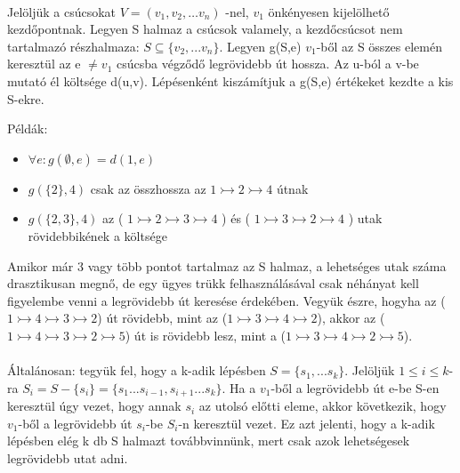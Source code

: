 \paragraph{}
Jelöljük a csúcsokat \( V=\left(v_1,v_2,\ldots v_n\right) \) -nel, \(v_1\) önkényesen kijelölhető kezdőpontnak. Legyen S halmaz a csúcsok valamely, a kezdőcsúcsot nem tartalmazó részhalmaza: \(S \subseteq \{v_2,...v_n\}\). Legyen g(S,e) \(v_1\)-ből az S összes elemén keresztül az e \(\neq v_1\)  csúcsba végződő legrövidebb út hossza. Az u-ból a v-be mutató él költsége d(u,v).
Lépésenként kiszámítjuk a g(S,e) értékeket kezdte a kis S-ekre.

Példák:
\begin{itemize}
	\item \(\forall e: g(\emptyset,e) = d(1,e)\)
	\item \(g(\{2\},4)\) csak az összhossza az  \(1 \rightarrowtail 2 \rightarrowtail 4\) útnak
	\item \(g(\{2,3\},4)\)  az ( \(1 \rightarrowtail 2 \rightarrowtail 3 \rightarrowtail 4\) ) és ( \(1 \rightarrowtail 3 \rightarrowtail 2 \rightarrowtail 4\) ) utak rövidebbikének a költsége
\end{itemize}

Amikor már 3 vagy több pontot tartalmaz az S halmaz, a lehetséges utak száma drasztikusan megnő, de egy ügyes trükk felhasználásával csak néhányat kell figyelembe venni a legrövidebb út keresése érdekében. Vegyük észre, hogyha az (\(1\rightarrowtail 4\rightarrowtail 3\rightarrowtail 2\)) út rövidebb, mint az (\(1\rightarrowtail 3\rightarrowtail 4\rightarrowtail 2\)), akkor az (\(1\rightarrowtail 4\rightarrowtail 3\rightarrowtail 2\rightarrowtail 5\)) út is rövidebb lesz, mint a (\(1\rightarrowtail 3\rightarrowtail 4\rightarrowtail 2\rightarrowtail 5\)).
\paragraph{}
Általánosan: tegyük fel, hogy a k-adik lépésben \(S=\{s_1,...s_k\}\). Jelöljük \(1\leqslant i\leqslant k\)-ra \(S_i = S-\{s_i\} = \{s_1...s_{i-1},s_{i+1}...s_k\} \). Ha a \(v_1\)-ből a legrövidebb út e-be S-en keresztül úgy vezet, hogy annak \(s_i\) az utolsó előtti eleme, akkor következik, hogy \(v_1\)-ből a legrövidebb út \(s_i\)-be \(S_i\)-n keresztül vezet. Ez azt jelenti, hogy a k-adik lépésben elég k db S halmazt továbbvinnünk, mert csak azok lehetségesek legrövidebb utat adni.

